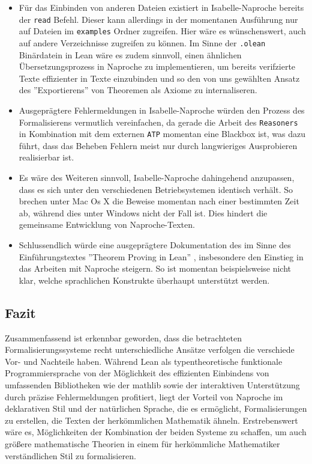 \documentclass[a4paper,12pt]{scrartcl}
\begin{document}
\begin{itemize}
\item Für das Einbinden von anderen Dateien existiert in Isabelle-Naproche bereits der \verb!read! Befehl. Dieser kann allerdings in der momentanen Ausführung nur auf Dateien im \verb!examples! Ordner zugreifen.
Hier wäre es wünschenswert, auch auf andere Verzeichnisse zugreifen zu können. Im Sinne der \verb!.olean! Binärdatein in Lean wäre es zudem sinnvoll, einen ähnlichen Übersetzungsprozess in Naproche zu implementieren, um bereits verifzierte Texte effizienter in Texte einzubinden und so den von uns gewählten Ansatz des ''Exportierens'' von Theoremen als Axiome zu internaliseren.

\item Ausgeprägtere Fehlermeldungen in Isabelle-Naproche würden den Prozess des Formalisierens vermutlich vereinfachen, da gerade die Arbeit des \verb!Reasoners! in Kombination mit dem externen \verb!ATP! momentan eine Blackbox ist, was dazu führt, dass das Beheben Fehlern meist nur durch langwieriges Ausprobieren realisierbar ist.

\item Es wäre des Weiteren sinnvoll, Isabelle-Naproche dahingehend anzupassen, dass es sich unter den verschiedenen Betriebsystemen identisch verhält. So brechen unter Mac Os X die Beweise momentan nach einer bestimmten Zeit ab, während dies unter Windows nicht der Fall ist. Dies hindert die gemeinsame Entwicklung von Naproche-Texten.

\item Schlussendlich würde eine ausgeprägtere Dokumentation des im Sinne des Einführungstextes ''Theorem Proving in Lean'' \cite{bibtex.e}, insbesondere den Einstieg in das Arbeiten mit Naproche steigern. So ist momentan beispielsweise nicht klar, welche sprachlichen Konstrukte überhaupt unterstützt werden.

\end{itemize}

\subsection{Fazit}

Zusammenfassend ist erkennbar geworden, dass die betrachteten Formalisierungssysteme recht unterschiedliche Ansätze verfolgen die verschiede Vor- und Nachteile haben. Während Lean als typentheoretische funktionale Programmiersprache von der Möglichkeit des effizienten Einbindens von umfassenden Bibliotheken wie der mathlib sowie der interaktiven Unterstützung durch präzise Fehlermeldungen profitiert,
liegt der Vorteil von Naproche im deklarativen Stil und der natürlichen Sprache, die es ermöglicht, Formalisierungen zu erstellen, die Texten der herkömmlichen Mathematik ähneln.
Erstrebenswert wäre es, Möglichkeiten der Kombination der beiden Systeme zu schaffen, um auch größere mathematische Theorien in einem für herkömmliche Mathematiker verständlichen Stil zu formalisieren.

\newpage


\end{document}
